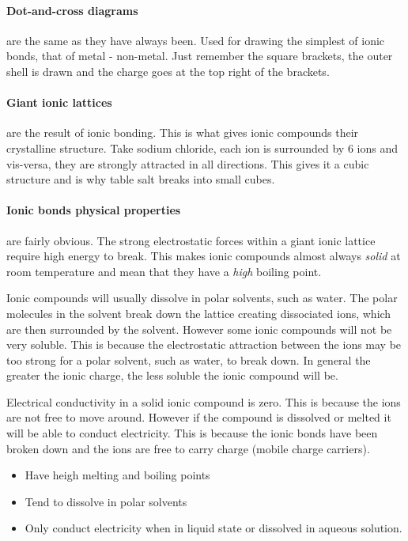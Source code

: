 	\paragraph{Dot-and-cross diagrams} are the same as they have always been.
	Used for drawing the simplest of ionic bonds, that of metal - non-metal.
	Just remember the square brackets, the outer shell is drawn and the charge goes at the top right of the brackets. %
	 
	\paragraph{Giant ionic lattices} are the result of ionic bonding. This is what gives ionic compounds their crystalline structure.
	Take sodium chloride, each  ion is surrounded by 6  ions and vis-versa, they are strongly attracted in all directions.
	This gives it a cubic structure and is why table salt breaks into small cubes. 
	 
	\paragraph{Ionic bonds physical properties} are fairly obvious. The strong electrostatic forces within a giant ionic lattice require high energy to break.
	This makes ionic compounds almost always \textit{solid} at room temperature and mean that they have a \textit{high} boiling point.
	 
	Ionic compounds will usually dissolve in polar solvents, such as water.
	The polar molecules in the solvent break down the lattice creating dissociated ions, which are then surrounded by the solvent.
	However some ionic compounds will not be very soluble.
	This is because the electrostatic attraction between the ions may be too strong for a polar solvent, such as water, to break down.
	In general the greater the ionic charge, the less soluble the ionic compound will be.
	 
	Electrical conductivity in a solid ionic compound is zero. This is because the ions are not free to move around.
	However if the compound is dissolved or melted it will be able to conduct electricity.
	This is because the ionic bonds have been broken down and the ions are free to carry charge (mobile charge carriers).
	 
	\begin{itemize}
		\item Have heigh melting and boiling points
		\item Tend to dissolve in polar solvents
		\item Only conduct electricity when in liquid state or dissolved in aqueous solution.
	\end{itemize}
	 
